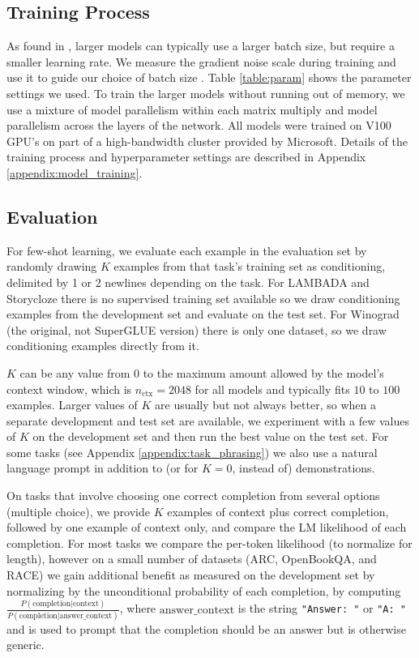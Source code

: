 \documentclass{article}
\begin{document}
    \subsection{Training Process}
    \label{section:Training Process}
As found in \cite{kaplan2020scaling, mcc2018batchsize}, larger models can typically use a larger batch size, but require a smaller learning rate. We measure the gradient noise scale during training and use it to guide our choice of batch size \cite{mcc2018batchsize}. Table \ref{table:param} shows the parameter settings we used. To train the larger models without running out of memory, we use a mixture of model parallelism within each matrix multiply and model parallelism across the layers of the network.   All models were trained on V100 GPU’s on part of a high-bandwidth cluster provided by Microsoft.  Details of the training process and hyperparameter settings are described in Appendix \ref{appendix:model_training}.

    \subsection{Evaluation}
    \label{section:Evaluation}
For few-shot learning, we evaluate each example in the evaluation set by randomly drawing $K$ examples from that task’s training set as conditioning, delimited by 1 or 2 newlines depending on the task.  For LAMBADA and Storycloze there is no supervised training set available so we draw conditioning examples from the development set and evaluate on the test set.  For Winograd (the original, not SuperGLUE version) there is only one dataset, so we draw conditioning examples directly from it.

$K$ can be any value from 0 to the maximum amount allowed by the model’s context window, which is $n_{\mathrm{ctx}}=2048$ for all models and typically fits $10$ to $100$ examples.  Larger values of $K$ are usually but not always better, so when a separate development and test set are available, we experiment with a few values of $K$ on the development set and then run the best value on the test set.  For some tasks (see Appendix \ref{appendix:task_phrasing}) we also use a natural language prompt in addition to (or for $K=0$, instead of) demonstrations.

On tasks that involve choosing one correct completion from several options (multiple choice), we provide $K$ examples of context plus correct completion, followed by one example of context only, and compare the LM likelihood of each completion.  For most tasks we compare the per-token likelihood (to normalize for length), however on a small number of datasets (ARC, OpenBookQA, and RACE) we gain additional benefit as measured on the development set by normalizing by the unconditional probability of each completion, by computing $\frac{P(\mathrm{completion} | \mathrm{context})}{P(\mathrm{completion} | \mathrm{answer\_context})}$, where $\mathrm{answer\_context}$ is the string \texttt{"Answer: "} or \texttt{"A: "} and is used to prompt that the completion should be an answer but is otherwise generic.
\end{document}
